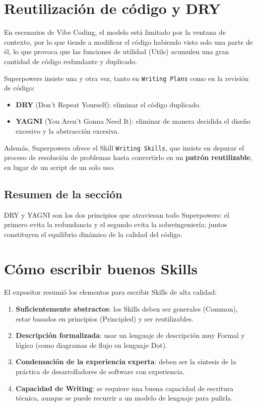 \documentclass[a4paper]{article}
\begin{document}
\section{Reutilización de código y DRY}

En escenarios de Vibe Coding, el modelo está limitado por la ventana de contexto, por lo que tiende a modificar el código habiendo visto solo una parte de él, lo que provoca que las funciones de utilidad (Utils) acumulen una gran cantidad de código redundante y duplicado.

Superpowers insiste una y otra vez, tanto en \texttt{Writing Plans} como en la revisión de código:

\begin{itemize}
    \item \textbf{DRY} (Don't Repeat Yourself): eliminar el código duplicado.
    \item \textbf{YAGNI} (You Aren't Gonna Need It): eliminar de manera decidida el diseño excesivo y la abstracción excesiva.
\end{itemize}

Además, Superpowers ofrece el Skill \texttt{Writing Skills}, que insiste en depurar el proceso de resolución de problemas hasta convertirlo en un \textbf{patrón reutilizable}, en lugar de un script de un solo uso.

\subsection{Resumen de la sección}

DRY y YAGNI son los dos principios que atraviesan todo Superpowers: el primero evita la redundancia y el segundo evita la sobreingeniería; juntos constituyen el equilibrio dinámico de la calidad del código.

\section{Cómo escribir buenos Skills}

El expositor resumió los elementos para escribir Skills de alta calidad:

\begin{enumerate}
    \item \textbf{Suficientemente abstractos}: los Skills deben ser generales (Common), estar basados en principios (Principled) y ser reutilizables.
    \item \textbf{Descripción formalizada}: usar un lenguaje de descripción muy Formal y lógico (como diagramas de flujo en lenguaje Dot).
    \item \textbf{Condensación de la experiencia experta}: deben ser la síntesis de la práctica de desarrolladores de software con experiencia.
    \item \textbf{Capacidad de Writing}: se requiere una buena capacidad de escritura técnica, aunque se puede recurrir a un modelo de lenguaje para pulirla.
\end{enumerate}
\end{document}
